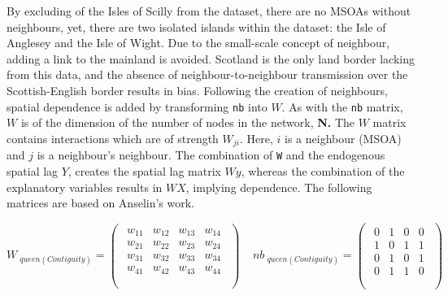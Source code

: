 \documentclass[12pt,twoside]{reedthesis}
\begin{document}
By excluding of the Isles of Scilly from the dataset, there are no MSOAs without neighbours, yet, there are two isolated islands within the dataset: the Isle of Anglesey and the Isle of Wight. Due to the small-scale concept of neighbour, adding a link to the mainland is avoided. Scotland is the only land border lacking from this data, and the absence of neighbour-to-neighbour transmission over the Scottish-English border results in bias. Following the creation of neighbours, spatial dependence is added by transforming \texttt{nb} into \(W\). As with the \texttt{nb} matrix, \(W\) is of the dimension of the number of nodes in the network, \textbf{N.} The \(W\) matrix contains interactions which are of strength \(W_{ji}\). Here, \(i\) is a neighbour (MSOA) and \(j\) is a neighbour's neighbour. The combination of \texttt{W} and the endogenous spatial lag \(Y\), creates the spatial lag matrix \(Wy\), whereas the combination of the explanatory variables results in \(WX\), implying dependence. The following matrices are based on Anselin's work.
~

\({W\ }_{queen\left(Contiguity\right)}=\left(\begin{matrix}\begin{matrix}w_{11}&w_{12}&w_{13}&w_{14}\\w_{21}&w_{22}&w_{23}&w_{24}\\w_{31}&w_{32}&w_{33}&w_{34}\\w_{41}&w_{42}&w_{43}&w_{44}\\\end{matrix}\\\end{matrix}\right)\ \ \ \ \ {nb\ }_{queen\left(Contiguity\right)}=\left(\begin{matrix}\begin{matrix}0&1&0&0\\1&0&1&1\\0&1&0&1\\0&1&1&0\\\end{matrix}\\\end{matrix}\right)\ \ \ \ \)
~
\end{document}
